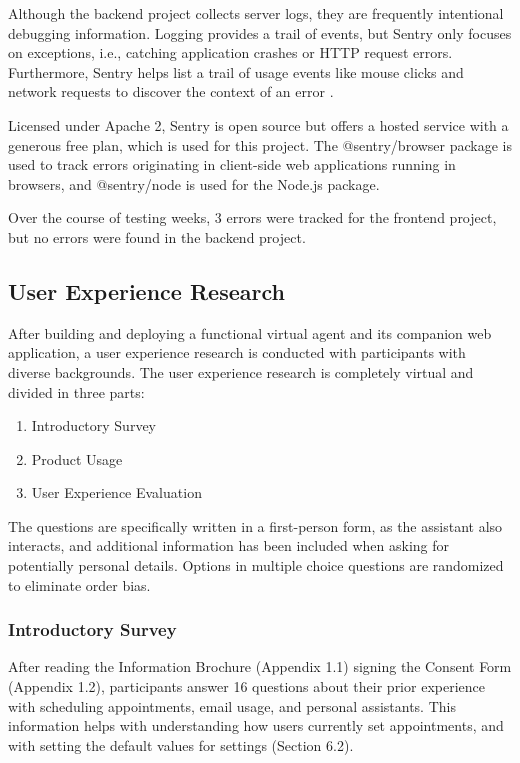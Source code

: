\documentclass{article}
\begin{document}
Although the backend project collects server logs, they are frequently intentional debugging information. Logging provides a trail of events, but Sentry only focuses on exceptions, i.e., catching application crashes or HTTP request errors. Furthermore, Sentry helps list a trail of usage events like mouse clicks and network requests to discover the context of an error \cite{noauthor_sentry_nodate-2}.

Licensed under Apache 2, Sentry is open source but offers a hosted service with a generous free plan, which is used for this project. The @sentry/browser package is used to track errors originating in client-side web applications running in browsers, and @sentry/node is used for the Node.js package.

Over the course of testing weeks, 3 errors were tracked for the frontend project, but no errors were found in the backend project.

\subsection{User Experience Research}

After building and deploying a functional virtual agent and its companion web application, a user experience research is conducted with participants with diverse backgrounds. The user experience research is completely virtual and divided in three parts:

\begin{enumerate}
	\item Introductory Survey
	\item Product Usage
	\item User Experience Evaluation
\end{enumerate}

The questions are specifically written in a first-person form, as the assistant also interacts, and additional information has been included when asking for potentially personal details. Options in multiple choice questions are randomized to eliminate order bias.

\subsubsection{Introductory Survey}

After reading the Information Brochure (Appendix 1.1) signing the Consent Form (Appendix 1.2), participants answer 16 questions about their prior experience with scheduling appointments, email usage, and personal assistants. This information helps with understanding how users currently set appointments, and with setting the default values for settings (Section 6.2).
\end{document}
